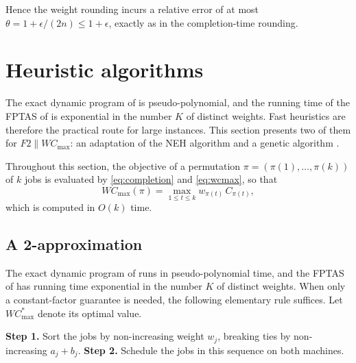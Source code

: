 \documentclass[12pt]{article}
\let\origsection\section
\renewcommand{\section}{\FloatBarrier\origsection}
\begin{document}
\begin{sloppypar}
        Hence the weight rounding incurs
        a relative error of at most $\theta=1+\epsilon/(2n)\le 1+\epsilon$, exactly as in the
        completion-time rounding.
        
        \section{Heuristic algorithms}     \label{sec:heuristics}
        
        The exact dynamic program of  is pseudo-polynomial, and the
        running time of the FPTAS of  is exponential in the number $K$ of
        distinct weights. Fast heuristics are therefore the practical route for large instances.
        This section presents two of them for $F2 \parallel W C_{\max}$: an adaptation of the NEH
        algorithm \citep{puka2024} and a genetic algorithm \citep{qiao2022adaptive}.
        
        Throughout this section, the objective of a permutation
        $\pi=(\pi(1),\dots,\pi(k))$ of $k$ jobs is evaluated by \cref{eq:completion} and
        \cref{eq:wcmax}, so that
        \[
        W C_{\max}(\pi)=\max_{1\le t\le k} w_{\pi(t)}\, C_{\pi(t)},
        \]
        which is computed in $O(k)$ time.
        
        \subsection{A 2-approximation}
        \label{sub:approx2}
        
        The exact dynamic program of  runs in pseudo-polynomial
        time, and the FPTAS of  has running time exponential in the
        number $K$ of distinct weights. When only a constant-factor guarantee is needed, the
        following elementary rule suffices.  Let $W C_{\max}^{*}$ denote its optimal value.
        
        \begin{algorithm}[H]
            \small
            \linespread{1.2}\selectfont
            \SetAlgoLined
            \DontPrintSemicolon
            \caption{2-Approximation for $F2 \parallel W C_{\max}$}\label{alg:approx2}
            \BlankLine
            \textbf{Step 1.} Sort the jobs by non-increasing weight $w_j$, breaking ties by non-increasing
            $a_j+b_j$. \;
            \textbf{Step 2.} Schedule the jobs in this sequence on both machines. \;
        \end{algorithm}
        

\end{sloppypar}
\end{document}
